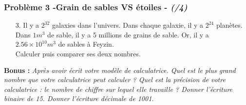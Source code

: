 \documentclass[11pt]{article}
\begin{document}
\subsubsection*{Problème 3 -Grain de sables VS étoiles  - \textit{(/4)}}
\begin{enumerate}
\item[3.] Il y a $2^{32}$ galaxies dans l'univers. Dans chaque galaxie, il y a $2^{24}$ planètes.\\
Dans $1m^3$ de sable, il y a 5 millions de grains de sable. Or, il y a $2.56 \times 10 ^{10} m^3$ de sables à Feyzin.\\
Calculer puis comparer ses deux nombres.

\end{enumerate}

\textbf{Bonus : } \textit{Après avoir écrit votre modèle de calculatrice. Quel est le plus grand nombre que votre calculatrice peut calculer ? Quel est la précision de votre calculatrice : le nombre de chiffre sur lequel elle travaille ? Donner l'écriture binaire de 15. Donner l'écriture décimale de 1001.}
\end{document}
